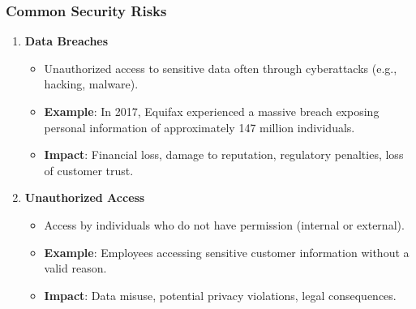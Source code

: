 \documentclass[aspectratio=169]{beamer}
\begin{document}
\begin{frame}[fragile]
    \frametitle{Common Security Risks}
    \begin{enumerate}
        \item \textbf{Data Breaches}
            \begin{itemize}
                \item Unauthorized access to sensitive data often through cyberattacks (e.g., hacking, malware).
                \item \textbf{Example}: In 2017, Equifax experienced a massive breach exposing personal information of approximately 147 million individuals.
                \item \textbf{Impact}: Financial loss, damage to reputation, regulatory penalties, loss of customer trust.
            \end{itemize}
        
        \item \textbf{Unauthorized Access}
            \begin{itemize}
                \item Access by individuals who do not have permission (internal or external).
                \item \textbf{Example}: Employees accessing sensitive customer information without a valid reason.
                \item \textbf{Impact}: Data misuse, potential privacy violations, legal consequences.
            \end{itemize}
    \end{enumerate}
\end{frame}
\end{document}
